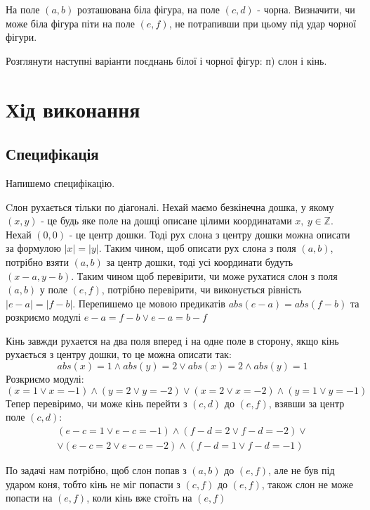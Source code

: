 \documentclass[14pt,a4paper]{extarticle}
\theoremstyle{definition}
\begin{document}
На поле $ (a, b) $ розташована біла фігура,
на поле $ (c, d) $ - чорна. Визначити,
чи може біла фігура піти на поле $ (e, f) $,
не потрапивши при цьому під удар чорної фігури.

Розглянути наступні варіанти поєднань білої і чорної фігур: п) слон і кінь.

\section{Хід виконання}

\subsection{Специфікація}

Напишемо специфікацію.

Cлон рухається тільки по діагоналі.
Нехай маємо безкінечна дошка, у якому $(x,y)$ - це будь яке поле на дошці
описане цілими координатами $x,\ y \in \mathbb{Z}$.
Нехай $(0,0)$ - це центр дошки.
Тоді рух слона з центру дошки можна описати за формулою $|x|=|y|$.
Таким чином, щоб описати рух слона з поля $(a,b)$, потрібно взяти $(a,b)$ за
центр дошки, тоді усі координати будуть $(x-a,y-b)$.
Таким чином щоб перевірити, чи може рухатися слон з поля $(a,b)$ у поле
$(e,f)$, потрібно перевірити, чи виконується рівність $|e-a|=|f-b|$.
Перепишемо це мовою предикатів $abs(e-a)=abs(f-b)$ та розкриємо модулі
$e-a=f-b \lor e-a=b-f$

Кінь завжди рухается на два поля вперед і на одне поле в сторону,
якщо кінь рухається з центру дошки, то це можна описати так:
\[abs(x)=1 \land abs(y)=2 \lor abs(x)=2 \land abs(y)=1\]
Розкриємо модулі:
\[(x=1 \lor x=-1) \land (y=2 \lor y=-2) \lor (x=2 \lor x=-2)
\land (y=1 \lor y=-1)\]
Тепер перевіримо, чи може кінь перейти з $(c,d)$ до $(e,f)$, взявши за
центр поле $(c,d)$:
\begin{multline*}
  (e-c=1 \lor e-c=-1) \land (f-d=2 \lor f-d=-2) \lor \\
  \lor (e-c=2 \lor e-c=-2) \land (f-d=1 \lor f-d=-1)
\end{multline*}

По задачі нам потрібно, щоб слон попав з $(a,b)$ до $(e,f)$,
але не був під ударом коня, тобто кінь не міг попасти з $(c,f)$ до $(e,f)$,
також слон не може попасти на $(e,f)$, коли кінь вже стоїть на $(e,f)$
\end{document}

